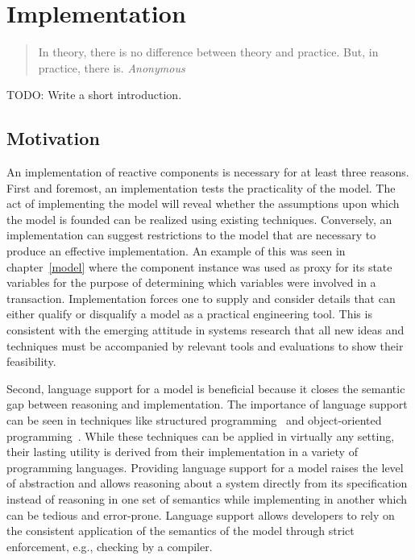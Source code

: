 \chapter{Implementation \label{implementation}}

\begin{quote}
In theory, there is no difference between theory and practice. \linebreak
But, in practice, there is.  \emph{Anonymous}
\end{quote}

TODO:  Write a short introduction.

\section{Motivation}

An implementation of reactive components is necessary for at least three reasons.
First and foremost, an implementation tests the practicality of the model.
The act of implementing the model will reveal whether the assumptions upon which the model is founded can be realized using existing techniques.
Conversely, an implementation can suggest restrictions to the model that are necessary to produce an effective implementation.
An example of this was seen in chapter~\ref{model} where the component instance was used as proxy for its state variables for the purpose of determining which variables were involved in a transaction.
Implementation forces one to supply and consider details that can either qualify or disqualify a model as a practical engineering tool.
This is consistent with the emerging attitude in systems research that all new ideas and techniques must be accompanied by relevant tools and evaluations to show their feasibility.

Second, language support for a model is beneficial because it closes the semantic gap between reasoning and implementation.
The importance of language support can be seen in techniques like structured programming~\cite{dahl1972structured} and object-oriented programming~\cite{booch1982object}.
While these techniques can be applied in virtually any setting, their lasting utility is derived from their implementation in a variety of programming languages.
Providing language support for a model raises the level of abstraction and allows reasoning about a system directly from its specification instead of reasoning in one set of semantics while implementing in another which can be tedious and error-prone.
Language support allows developers to rely on the consistent application of the semantics of the model through strict enforcement, e.g., checking by a compiler.

